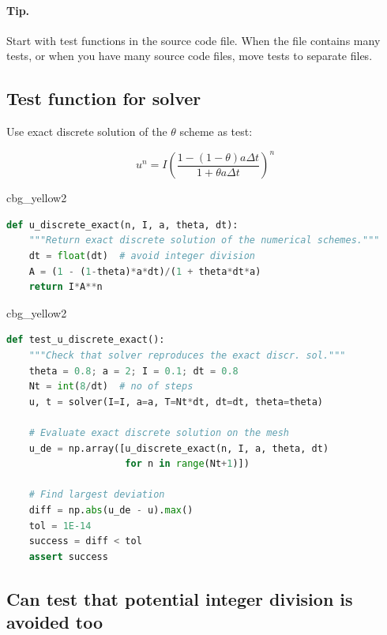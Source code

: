\documentclass[%
oneside,                 %
final,                   %
10pt]{article}
\newenvironment{_cod_tight}[1]{
   \def\FrameCommand{\colorbox{#1}}
   \FrameRule0.6pt\MakeFramed {\FrameRestore}\vskip3mm}
   {\vskip0mm\endMakeFramed}
\newenvironment{cod}[1]{
\bgroup\rmfamily
\fboxsep=0mm\relax
\begin{_cod_tight}{#1}
\list{}{\parsep=-2mm\parskip=0mm\topsep=0pt\leftmargin=2mm
\rightmargin=2\leftmargin\leftmargin=4pt\relax}
\item\relax}
{\endlist\end{_cod_tight}\egroup}
\begin{document}
\paragraph{Tip.}
Start with test functions in the source code file. When the file
contains many tests, or when you have many source code files,
move tests to separate files.




\subsection*{Test function for solver}

Use exact discrete solution of the $\theta$ scheme as test:

\[ u^n = I\left(
\frac{1 - (1-\theta) a\Delta t}{1 + \theta a \Delta t}
\right)^n\]

\begin{cod}{cbg_yellow2}\begin{lstlisting}[language=Python,style=simple,xleftmargin=2mm]
def u_discrete_exact(n, I, a, theta, dt):
    """Return exact discrete solution of the numerical schemes."""
    dt = float(dt)  # avoid integer division
    A = (1 - (1-theta)*a*dt)/(1 + theta*dt*a)
    return I*A**n
\end{lstlisting}\end{cod}
\noindent

\begin{cod}{cbg_yellow2}\begin{lstlisting}[language=Python,style=simple,xleftmargin=2mm]
def test_u_discrete_exact():
    """Check that solver reproduces the exact discr. sol."""
    theta = 0.8; a = 2; I = 0.1; dt = 0.8
    Nt = int(8/dt)  # no of steps
    u, t = solver(I=I, a=a, T=Nt*dt, dt=dt, theta=theta)

    # Evaluate exact discrete solution on the mesh
    u_de = np.array([u_discrete_exact(n, I, a, theta, dt)
                     for n in range(Nt+1)])

    # Find largest deviation
    diff = np.abs(u_de - u).max()
    tol = 1E-14
    success = diff < tol
    assert success
\end{lstlisting}\end{cod}
\noindent

\subsection*{Can test that potential integer division is avoided too}
\end{document}
